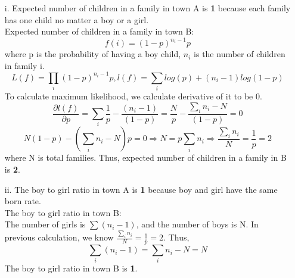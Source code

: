 \item[(a)]
	\begin{itemize}  
	\item[i.]	
	Expected number of children in a family in town A is \textbf{1} because each family has one child no matter a boy or a girl.\\
	Expected number of children in a family in town B:
	\begin{equation*}
		f(i) = (1-p)^{n_i-1}p
	\end{equation*}
	where p is the probability of having a boy child, $n_i$ is the number of children in family i.
	\begin{equation*}
		L(f) = \prod_i (1-p)^{n_i-1}p, l(f)=\sum_i log(p)+(n_i-1)log(1-p)
	\end{equation*}
	To calculate maximum likelihood, we calculate derivative of it to be 0.
	\begin{equation*}
		\frac{\partial l(f)}{\partial p}= \sum_i \frac{1}{p}-\frac{(n_i-1)}{(1-p)}=\frac{N}{p}-\frac{\sum_in_i-N}{(1-p)}=0
	\end{equation*}
	\begin{equation*}
		N(1-p)-(\sum_in_i-N)p=0\Rightarrow N = p\sum_in_i \Rightarrow \frac{\sum_in_i}{N} = \frac{1}{p} = 2
	\end{equation*}
	where N is total families. Thus, expected number of children in a family in B is \textbf{2}.  
	\item[ii.]
	The boy to girl ratio in town A is \textbf{1} because boy and girl have the same born rate. \\ 
	The boy to girl ratio in town B:\\
	The number of girls is $\sum (n_i-1)$, and the number of boys is N.	
	In previous calculation, we know $\frac{\sum_in_i}{N} = \frac{1}{p} = 2$. Thus,
	\begin{equation*}
		\sum_i( n_i-1 )=  \sum_in_i - N = N
	\end{equation*}
	The boy to girl ratio in town B is \textbf{1}.
	\end{itemize}
\item[(b)]
